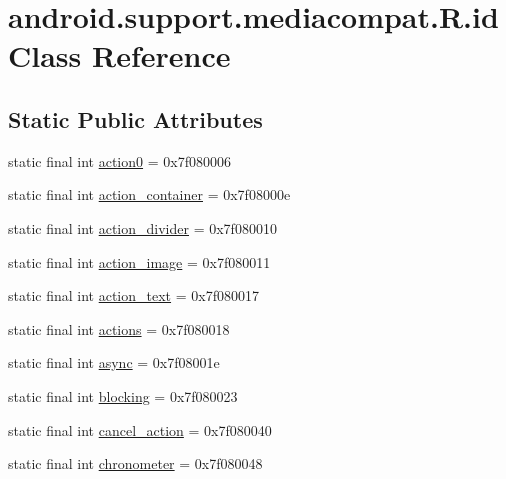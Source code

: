 \hypertarget{classandroid_1_1support_1_1mediacompat_1_1_r_1_1id}{}\section{android.\+support.\+mediacompat.\+R.\+id Class Reference}
\label{classandroid_1_1support_1_1mediacompat_1_1_r_1_1id}
\subsection*{Static Public Attributes}
\begin{DoxyCompactItemize}
\item 
static final int \mbox{\hyperlink{classandroid_1_1support_1_1mediacompat_1_1_r_1_1id_a0d129d7ff0edd3bb3cf6a74f736656cb}{action0}} = 0x7f080006
\item 
static final int \mbox{\hyperlink{classandroid_1_1support_1_1mediacompat_1_1_r_1_1id_a89d378fa3c49f2d17cfd27b0e9109485}{action\+\_\+container}} = 0x7f08000e
\item 
static final int \mbox{\hyperlink{classandroid_1_1support_1_1mediacompat_1_1_r_1_1id_a26eba072923f374514cf98b6be9ad972}{action\+\_\+divider}} = 0x7f080010
\item 
static final int \mbox{\hyperlink{classandroid_1_1support_1_1mediacompat_1_1_r_1_1id_a750d59c19458781a09100408ad29d103}{action\+\_\+image}} = 0x7f080011
\item 
static final int \mbox{\hyperlink{classandroid_1_1support_1_1mediacompat_1_1_r_1_1id_af301b0fa42d008b5a7c1aa86787ed39a}{action\+\_\+text}} = 0x7f080017
\item 
static final int \mbox{\hyperlink{classandroid_1_1support_1_1mediacompat_1_1_r_1_1id_ad97d7132771263bce1d2a994b2efcfc5}{actions}} = 0x7f080018
\item 
static final int \mbox{\hyperlink{classandroid_1_1support_1_1mediacompat_1_1_r_1_1id_a15c518d0493a2fb5c512d706c3f5bef9}{async}} = 0x7f08001e
\item 
static final int \mbox{\hyperlink{classandroid_1_1support_1_1mediacompat_1_1_r_1_1id_a7fbbad697c566515ce403c3a387aa835}{blocking}} = 0x7f080023
\item 
static final int \mbox{\hyperlink{classandroid_1_1support_1_1mediacompat_1_1_r_1_1id_a0e699f14dcc347ec3e7b40c64783d053}{cancel\+\_\+action}} = 0x7f080040
\item 
static final int \mbox{\hyperlink{classandroid_1_1support_1_1mediacompat_1_1_r_1_1id_ab3482c1acf38c737d255781505aecd9f}{chronometer}} = 0x7f080048

\end{DoxyCompactItemize}
